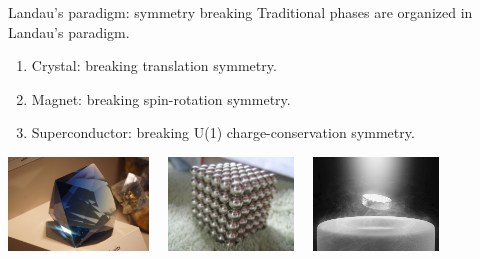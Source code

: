 \documentclass[xcolor=table, aspectratio=43,ignorenonframetext]{beamer}
\begin{document}
\begin{frame}{Landau's paradigm: symmetry breaking}
  Traditional phases are organized in Landau's paradigm.
  \begin{enumerate}
  \item Crystal: breaking translation symmetry.
  \item Magnet: breaking spin-rotation symmetry.
  \item Superconductor: breaking U(1) charge-conservation symmetry.
  \end{enumerate}
  \begin{center}
    \includegraphics[height=2.5cm]{../resources/crystal}~~
    \includegraphics[height=2.5cm]{../resources/magnet}~~
    \includegraphics[height=2.5cm]{../resources/sc}
  \end{center}
\end{frame}
\end{document}
